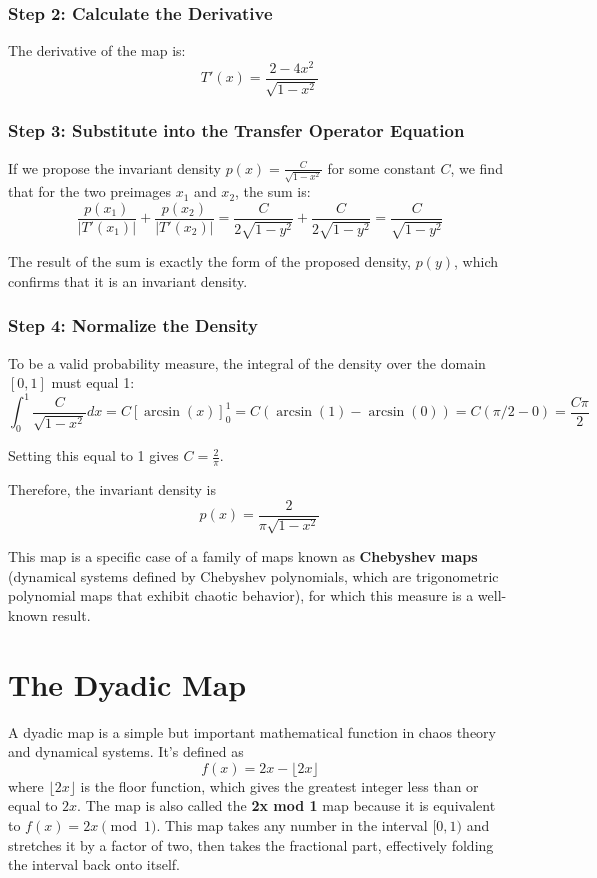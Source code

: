\documentclass[12pt,a4paper]{article}
\begin{document}
\subsubsection{Step 2: Calculate the Derivative}

The derivative of the map is:
\[
T'(x) = \frac{2-4x^2}{\sqrt{1-x^2}}
\]

\subsubsection{Step 3: Substitute into the Transfer Operator Equation}

If we propose the invariant density $p(x) = \frac{C}{\sqrt{1-x^2}}$ for some constant $C$, we find that for the two preimages $x_1$ and $x_2$, the sum is:
\[
\frac{p(x_1)}{|T'(x_1)|} + \frac{p(x_2)}{|T'(x_2)|} = \frac{C}{2\sqrt{1-y^2}} + \frac{C}{2\sqrt{1-y^2}} = \frac{C}{\sqrt{1-y^2}}
\]

The result of the sum is exactly the form of the proposed density, $p(y)$, which confirms that it is an invariant density.

\subsubsection{Step 4: Normalize the Density}

To be a valid probability measure, the integral of the density over the domain $[0, 1]$ must equal 1:
\[
\int_0^1 \frac{C}{\sqrt{1-x^2}}dx = C[\arcsin(x)]_0^1 = C(\arcsin(1)-\arcsin(0)) = C(\pi/2 - 0) = \frac{C\pi}{2}
\]

Setting this equal to 1 gives $C = \frac{2}{\pi}$.

Therefore, the invariant density is 
\[
p(x) = \frac{2}{\pi\sqrt{1-x^2}}
\]

This map is a specific case of a family of maps known as \textbf{Chebyshev maps} (dynamical systems defined by Chebyshev polynomials, which are trigonometric polynomial maps that exhibit chaotic behavior), for which this measure is a well-known result.

\section{The Dyadic Map}

A dyadic map is a simple but important mathematical function in chaos theory and dynamical systems. It's defined as 
\[
f(x) = 2x - \lfloor 2x \rfloor
\]
where $\lfloor 2x \rfloor$ is the floor function, which gives the greatest integer less than or equal to $2x$. The map is also called the \textbf{2x mod 1} map because it is equivalent to $f(x) = 2x \pmod{1}$. This map takes any number in the interval $[0, 1)$ and stretches it by a factor of two, then takes the fractional part, effectively folding the interval back onto itself.
\end{document}
